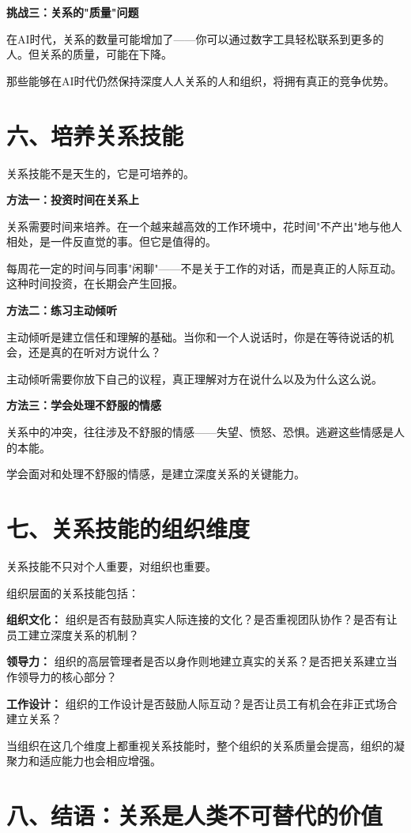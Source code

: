 \textbf{挑战三：关系的"质量"问题}

在AI时代，关系的数量可能增加了——你可以通过数字工具轻松联系到更多的人。但关系的质量，可能在下降。

那些能够在AI时代仍然保持深度人人关系的人和组织，将拥有真正的竞争优势。

\section{六、培养关系技能}


关系技能不是天生的，它是可培养的。

\textbf{方法一：投资时间在关系上}

关系需要时间来培养。在一个越来越高效的工作环境中，花时间"不产出"地与他人相处，是一件反直觉的事。但它是值得的。

每周花一定的时间与同事"闲聊"——不是关于工作的对话，而是真正的人际互动。这种时间投资，在长期会产生回报。

\textbf{方法二：练习主动倾听}

主动倾听是建立信任和理解的基础。当你和一个人说话时，你是在等待说话的机会，还是真的在听对方说什么？

主动倾听需要你放下自己的议程，真正理解对方在说什么以及为什么这么说。

\textbf{方法三：学会处理不舒服的情感}

关系中的冲突，往往涉及不舒服的情感——失望、愤怒、恐惧。逃避这些情感是人的本能。

学会面对和处理不舒服的情感，是建立深度关系的关键能力。

\section{七、关系技能的组织维度}


关系技能不只对个人重要，对组织也重要。

组织层面的关系技能包括：

\textbf{组织文化：} 组织是否有鼓励真实人际连接的文化？是否重视团队协作？是否有让员工建立深度关系的机制？

\textbf{领导力：} 组织的高层管理者是否以身作则地建立真实的关系？是否把关系建立当作领导力的核心部分？

\textbf{工作设计：} 组织的工作设计是否鼓励人际互动？是否让员工有机会在非正式场合建立关系？

当组织在这几个维度上都重视关系技能时，整个组织的关系质量会提高，组织的凝聚力和适应能力也会相应增强。

\section{八、结语：关系是人类不可替代的价值}


